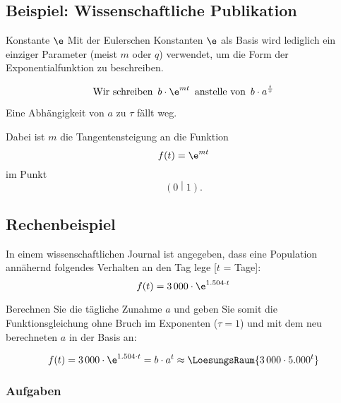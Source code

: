 \newpage

\subsection{Beispiel: Wissenschaftliche Publikation}


\begin{bemerkung}{Konstante $\e$}{}
  Mit der Eulerschen Konstanten $\e$ als Basis wird lediglich ein einziger
  Parameter (meist $m$ oder $q$) verwendet, um die Form der
  Exponentialfunktion zu beschreiben.

  $$\text{Wir schreiben }\, b\cdot{}\e^{mt} \,\text{ anstelle von }\, b\cdot{}a^{\frac{t}{\tau}}$$

  Eine Abhängigkeit von $a$ zu $\tau$ fällt weg.

  Dabei ist $m$ die Tangentensteigung an die Funktion $$f(t) = \e^{mt}$$
  im Punkt $$\left(0\middle|1\right).$$
\end{bemerkung}

\subsection*{Rechenbeispiel}

In einem wissenschaftlichen Journal ist angegeben, dass eine Population annähernd folgendes Verhalten an den Tag lege [$t$ = Tage]:
$$f(t) = 3\,000\cdot{}\e^{1.504\cdot{}t}$$

Berechnen Sie die tägliche Zunahme $a$ und geben Sie somit die Funktionsgleichung ohne Bruch im Exponenten ($\tau = 1$) und mit dem neu berechneten $a$ in der Basis an:

$$f(t) = 3\,000\cdot{}\e^{1.504\cdot{}t} = b\cdot{}a^t \approx \LoesungsRaum{3\,000\cdot{}5.000^t}$$



\subsubsection*{Aufgaben}
\newpage


